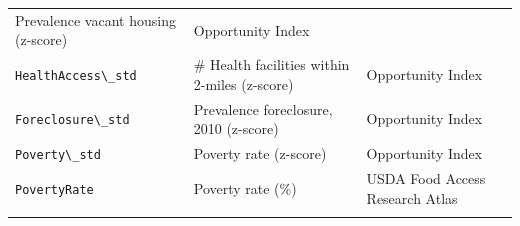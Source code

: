 \documentclass[
]{book}
\newcommand{\passthrough}[1]{#1}
\begin{document}
\begin{longtable}[]{@{}lll@{}}
\begin{minipage}[t]{0.29\columnwidth}
Prevalence vacant housing (z-score)\strut
\end{minipage} & \begin{minipage}[t]{0.43\columnwidth}\raggedright
Opportunity Index\strut
\end{minipage}\tabularnewline
\begin{minipage}[t]{0.19\columnwidth}\raggedright
\passthrough{\lstinline!HealthAccess\_std!}\strut
\end{minipage} & \begin{minipage}[t]{0.29\columnwidth}\raggedright
\# Health facilities within 2-miles (z-score)\strut
\end{minipage} & \begin{minipage}[t]{0.43\columnwidth}\raggedright
Opportunity Index\strut
\end{minipage}\tabularnewline
\begin{minipage}[t]{0.19\columnwidth}\raggedright
\passthrough{\lstinline!Foreclosure\_std!}\strut
\end{minipage} & \begin{minipage}[t]{0.29\columnwidth}\raggedright
Prevalence foreclosure, 2010 (z-score)\strut
\end{minipage} & \begin{minipage}[t]{0.43\columnwidth}\raggedright
Opportunity Index\strut
\end{minipage}\tabularnewline
\begin{minipage}[t]{0.19\columnwidth}\raggedright
\passthrough{\lstinline!Poverty\_std!}\strut
\end{minipage} & \begin{minipage}[t]{0.29\columnwidth}\raggedright
Poverty rate (z-score)\strut
\end{minipage} & \begin{minipage}[t]{0.43\columnwidth}\raggedright
Opportunity Index\strut
\end{minipage}\tabularnewline
\begin{minipage}[t]{0.19\columnwidth}\raggedright
\passthrough{\lstinline!PovertyRate!}\strut
\end{minipage} & \begin{minipage}[t]{0.29\columnwidth}\raggedright
Poverty rate (\%)\strut
\end{minipage} & \begin{minipage}[t]{0.43\columnwidth}\raggedright
USDA Food Access Research Atlas\strut
\end{minipage}\tabularnewline
\begin{minipage}[t]{0.19\columnwidth}\raggedright

\end{minipage}
\end{longtable}
\end{document}
